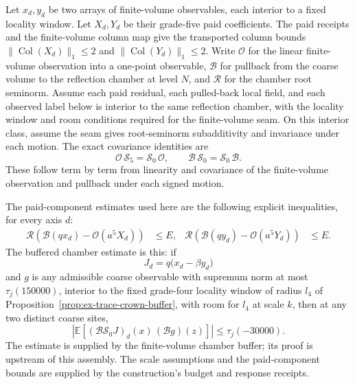 Let $x_d,y_d$ be two arrays of finite-volume observables, each interior to
a fixed locality window. Let $X_d,Y_d$ be their grade-five paid
coefficients. The paid receipts and the finite-volume column map give the transported
column bounds $\|\operatorname{Col}(X_d)\|_1\leq2$ and
$\|\operatorname{Col}(Y_d)\|_1\leq2$.
Write $\mathcal O$ for the linear finite-volume observation into a
one-point observable, $\mathcal B$ for pullback from the coarse volume to
the reflection chamber at level $N$, and $\mathcal R$ for the chamber root
seminorm. Assume each paid residual, each pulled-back local field, and each observed
label below is interior to the same reflection chamber, with the locality
window and room conditions required for the finite-volume seam. On this
interior class, assume the seam gives root-seminorm subadditivity and
invariance under each motion. The exact covariance identities are
\begin{equation}
 \mathcal O\,\mathscr S_5=\mathscr S_0\,\mathcal O,
 \qquad
 \mathcal B\,\mathscr S_0=\mathscr S_0\,\mathcal B.
 \label{eq:ex-trace-probe-covariance}
\end{equation}
These follow term by term from linearity and covariance of the finite-volume
observation and pullback under each signed motion.

The paid-component estimates used here are the following explicit
inequalities, for every axis $d$:
\begin{align}
 \mathcal R\!\left(\mathcal B(qx_d)-\mathcal O(a^5X_d)\right)&\leq E,
 &\mathcal R\!\left(\mathcal B(qy_d)-\mathcal O(a^5Y_d)\right)&\leq E.
 \label{eq:ex-trace-probe-paid-errors}
\end{align}
The buffered chamber estimate is this: if
\[
 J_d=q\bigl(x_d-\beta y_d\bigr)
\]
and $g$ is any admissible coarse observable with supremum norm at most
$\tau_j(150000)$, interior to the fixed grade-four locality window of
radius $l_4$ of Proposition~\ref{prop:ex-trace-crown-buffer}, with room
for $l_4$ at scale $k$, then at any two distinct coarse sites,
\begin{equation}
 \left|\mathbb E\left[(\mathcal B\mathscr S_0J)_d(x)\,
                    (\mathcal B g)(z)\right]\right|
       \leq\tau_j(-30000).
 \label{eq:ex-trace-probe-buffered}
\end{equation}
The estimate is supplied by the finite-volume chamber buffer; its proof is
upstream of this assembly. The scale assumptions and the paid-component
bounds are supplied by the construction's budget and response receipts.

